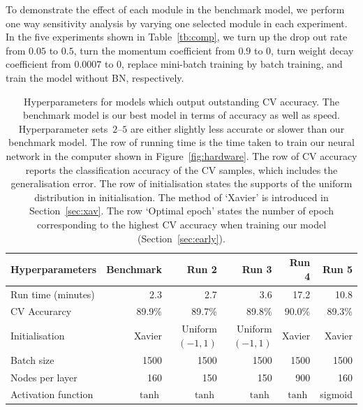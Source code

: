 To demonstrate the effect of each module in the benchmark model, we perform one way sensitivity analysis by varying one selected module in each experiment. 
In the five experiments shown in Table~\ref{tb:comp}, we turn up the drop out rate from $0.05$ to $0.5$, turn the momentum coefficient from $0.9$ to $0$, turn weight decay coefficient from $0.0007$ to $0$, replace mini-batch training by batch training, and train the model without BN, respectively.
\begin{table}
\caption{Hyperparameters for models which output outstanding CV accuracy. The benchmark model is our best model in terms of accuracy as well as speed. Hyperparameter sets~$2$--$5$ are either slightly less accurate or slower than our benchmark model. The row of running time is the time taken to train our neural network in the computer shown in Figure~\ref{fig:hardware}. The row of CV accuracy reports the classification accuracy of the CV samples, which includes the generalisation error. The row of initialisation states the supports of the uniform distribution in initialisation. The method of `Xavier' is introduced in Section~\ref{sec:xav}. The row `Optimal epoch' states the number of epoch corresponding to the highest CV accuracy when training our model (Section~\ref{sec:early}). \label{table:best-four-steps}}
\centering
{
\begin{tabular}{@{}lrrrrr@{}}
\toprule
Hyperparameters                & Benchmark  & Run 2           & Run 3           & Run 4  & Run 5  \\ \midrule
Run time (minutes)             & 2.3     & 2.7              & 3.6              & 17.2    & 10.8    \\
CV Accurarcy                 & 89.9\%  & 89.7\%           & 89.8\%           & 90.0\%  & 89.3\%  \\
Initialisation            & Xavier  & \parbox[t]{1.3cm}{\raggedleft Uniform\\$(-1,1)$} 
& \parbox[t]{1.3cm}{\raggedleft Uniform\\$(-1,1)$} 
                                                                            & Xavier  & Xavier  \\
Batch size                & 1500    & 1500             & 1500             & 1500    & 1500    \\
Nodes per layer         & 160     & 150              & 150              & 900     & 160     \\
Activation function       & $\tanh$ & $\tanh$          & $\tanh$          & $\tanh$ & sigmoid \\

\end{tabular}}
\end{table}
